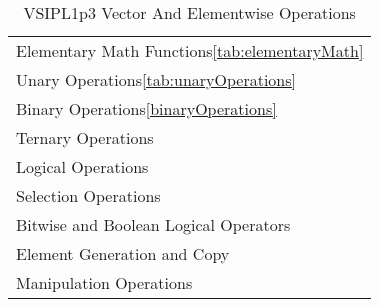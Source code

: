 \begin{table}[H]
\caption{VSIPL1p3 Vector And Elementwise Operations}
\label{tab:elementwiseChapter}
\begin{center}
\begin{tabular}{l}
Elementary Math Functions\ref{tab:elementaryMath}\\
Unary Operations\ref{tab:unaryOperations}\\
Binary Operations\ref{binaryOperations}\\
Ternary Operations\\
Logical Operations\\
Selection Operations\\
Bitwise and Boolean Logical Operators\\
Element Generation and Copy\\
Manipulation Operations\\
\end{tabular}
\end{center}
\label{default}
\end{table}%